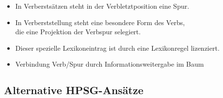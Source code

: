 {{\begin{itemize}[<+->]
\item In Verberstsätzen steht in der Verbletztposition eine Spur.
\item In Verberststellung steht eine besondere Form des Verbs,\\
      die eine Projektion der Verbspur selegiert.
\item Dieser spezielle Lexikoneintrag ist durch eine Lexikonregel lizenziert.
\item Verbindung Verb/Spur durch Informationsweitergabe im Baum
\end{itemize}



}



\subtitle{Konstituentenreihenfolge: Alternative HPSG-Ansätze}

\huberlintitlepage[22pt]


\subsection{Alternative HPSG-Ansätze}


}
